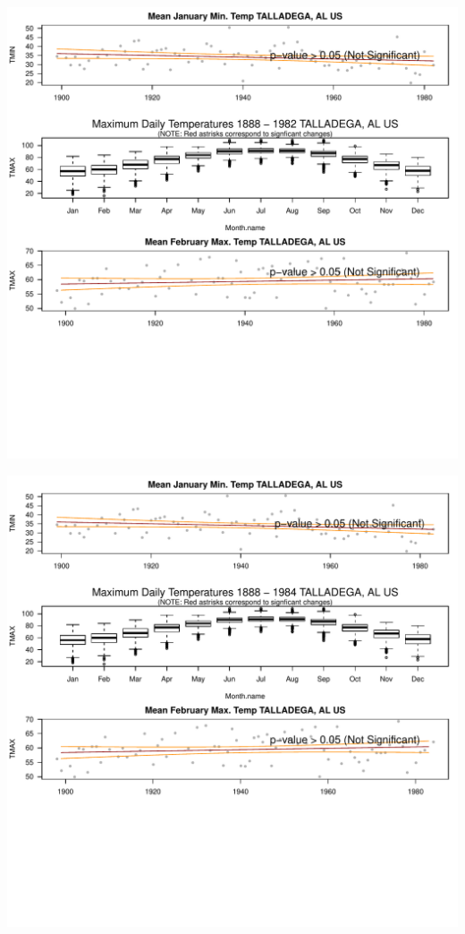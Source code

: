 \documentclass{article}\usepackage[]{graphicx}\usepackage[]{color}
\makeatletter
\def\maxwidth{ %
  \ifdim\Gin@nat@width>\linewidth
    \linewidth
  \else
    \Gin@nat@width
  \fi
}
\newenvironment{knitrout}{}{} %
\makeatother
\begin{document}
\begin{knitrout}
\includegraphics[width=\maxwidth]{figure/static_template-37} 

\includegraphics[width=\maxwidth]{figure/static_template-38} 


\end{knitrout}
\end{document}
